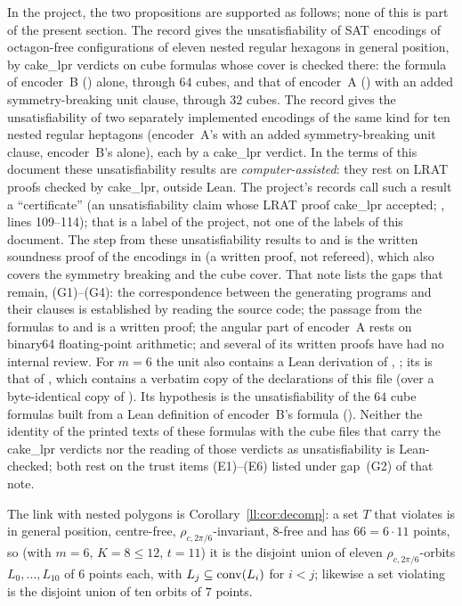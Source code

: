 \begin{remark}
In the project, the two propositions are supported as follows; none of this is part of the present section. The
record  gives the unsatisfiability of SAT encodings of octagon-free configurations of eleven nested
regular hexagons in general position, by cake\_lpr verdicts on cube formulas whose cover is checked there: the formula
of encoder~B () alone, through $64$ cubes, and that of encoder~A
() with an added symmetry-breaking unit clause, through $32$ cubes. The record 
gives the unsatisfiability of two separately implemented encodings of the same kind for ten nested regular heptagons
(encoder~A's with an added symmetry-breaking unit clause, encoder~B's alone), each by a cake\_lpr verdict. In the
terms of this document these unsatisfiability results are \emph{computer-assisted}: they rest on LRAT proofs checked
by cake\_lpr, outside Lean. The project's records call such a result a ``certificate'' (an unsatisfiability claim whose
LRAT proof cake\_lpr accepted; , lines 109--114); that is a label of the
project, not one of the labels of this document. The step from these unsatisfiability results to  and
 is the written soundness proof of the encodings in  (a written
proof, not refereed), which also covers the symmetry breaking and the
cube cover. That note lists the gaps that remain, (G1)--(G4): the correspondence between the generating programs and
their clauses is established by reading the source code; the passage from the formulas to  and
 is a written proof; the angular part of encoder~A rests on binary64 floating-point arithmetic;
and several of its written proofs have had no internal review. For $m=6$ the unit  also contains a Lean
derivation of , ; its  is that of
, which contains a verbatim copy of the declarations of this file (over a
byte-identical copy of ). Its hypothesis  is the
unsatisfiability of the $64$ cube formulas built from a Lean definition of encoder~B's formula ().
Neither the identity of the printed texts of these formulas with the cube files that carry the cake\_lpr verdicts nor
the reading of those verdicts as unsatisfiability is Lean-checked; both rest on the trust items (E1)--(E6) listed
under gap~(G2) of that note.

The link with nested polygons is Corollary~\ref{ll:cor:decomp}: a set $T$ that violates  is in general
position, centre-free, $\rho_{c,2\pi/6}$-invariant, $8$-free and has $66=6\cdot11$ points, so (with $m=6$, $K=8\le12$,
$t=11$) it is the disjoint union of eleven $\rho_{c,2\pi/6}$-orbits $L_0,\dots,L_{10}$ of $6$ points each, with
$L_j\subseteq\operatorname{conv}(L_i)$ for $i<j$; likewise a set violating  is the disjoint union of ten orbits of
$7$ points.
\end{remark}


